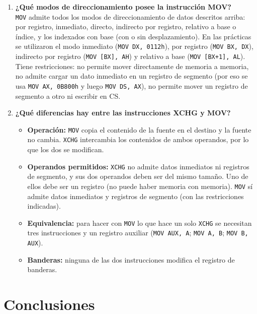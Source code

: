 \documentclass[10pt]{article}
\begin{document}
\begin{enumerate}
  \item \textbf{¿Qué modos de direccionamiento posee la instrucción MOV?}\\
  \texttt{MOV} admite todos los modos de direccionamiento de datos descritos arriba: por registro, inmediato, directo, indirecto por registro, relativo a base o índice, y los indexados con base (con o sin desplazamiento). En las prácticas se utilizaron el modo inmediato (\texttt{MOV DX, 0112h}), por registro (\texttt{MOV BX, DX}), indirecto por registro (\texttt{MOV [BX], AH}) y relativo a base (\texttt{MOV [BX+1], AL}). Tiene restricciones: no permite mover directamente de memoria a memoria, no admite cargar un dato inmediato en un registro de segmento (por eso se usa \texttt{MOV AX, 0B800h} y luego \texttt{MOV DS, AX}), no permite mover un registro de segmento a otro ni escribir en CS.

  \item \textbf{¿Qué diferencias hay entre las instrucciones XCHG y MOV?}\\
  \begin{itemize}
    \item \textbf{Operación:} \texttt{MOV} copia el contenido de la fuente en el destino y la fuente no cambia. \texttt{XCHG} intercambia los contenidos de ambos operandos, por lo que los dos se modifican.
    \item \textbf{Operandos permitidos:} \texttt{XCHG} no admite datos inmediatos ni registros de segmento, y sus dos operandos deben ser del mismo tamaño. Uno de ellos debe ser un registro (no puede haber memoria con memoria). \texttt{MOV} sí admite datos inmediatos y registros de segmento (con las restricciones indicadas).
    \item \textbf{Equivalencia:} para hacer con \texttt{MOV} lo que hace un solo \texttt{XCHG} se necesitan tres instrucciones y un registro auxiliar (\texttt{MOV AUX, A}; \texttt{MOV A, B}; \texttt{MOV B, AUX}).
    \item \textbf{Banderas:} ninguna de las dos instrucciones modifica el registro de banderas.
  \end{itemize}
\end{enumerate}

\section{Conclusiones}
\end{document}
